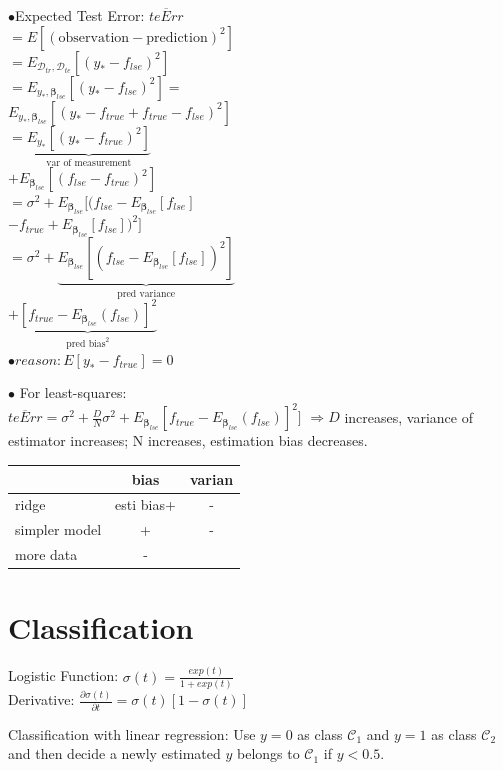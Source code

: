 \documentclass[10pt,a4paper,landscape]{article}
\newcommand{\bbeta}{\boldsymbol\beta}
\begin{document}
\begin{multicols*}{6}
 $\bullet$Expected Test Error: $\overline{teErr}$\\
 $= E[(\text{observation} - \text{prediction})^2]  $\\
 $= E_{\mathcal{D}_{tr},\mathcal{D}_{te}}[(y_* - f_{lse})^2]$\\
 $= E_{y_*, \bbeta_{lse}}[(y_* - f_{lse})^2]= $\\
 $E_{y_*, \bbeta_{lse}}[(y_* - f_{true} + f_{true} - f_{lse})^2] $\\
 $=\underbrace{E_{y_*}[(y_* - f_{true})^2]}_{\text{var of measurement}} $\\
 $+ E_{\bbeta_{lse}}[(f_{lse} - f_{true})^2]$ \\
 $=\sigma^2 + E_{\bbeta_{lse}}[(f_{lse} - E_{\bbeta_{lse}}[f_{lse}]$\\
 $ -  f_{true}+E_{\bbeta_{lse}}[f_{lse}] )^2]$ \\
 $=\sigma^2 + \underbrace{E_{\bbeta_{lse}}[(f_{lse} - E_{\bbeta_{lse}}[f_{lse}])^2]}_{\text{pred variance}} $\\
 $+\underbrace{[f_{true}-E_{\bbeta_{lse}}(f_{lse})] ^2}_{\text{pred bias}^2}$\\
 $\bullet reason: E[y_*-f_{true}]=0$
 
 $\bullet$ For least-squares:\\
 $\overline{teErr}=\sigma^2 + \frac{D}{N}\sigma^2 +E_{\bbeta_{lse}}[f_{true}-E_{\bbeta_{lse}}(f_{lse})] ^2]$
 $\Rightarrow D$ increases, variance of estimator increases; N increases, estimation bias decreases.


\begin{tabular}{ l || c | c }
                          & bias & varian \\
  \hline
ridge          & esti bias+    & - \\
simpler model    & +    & - \\
more data               & -    & \\
  \hline
\end{tabular}

\section{Classification}
Logistic Function: $\sigma(t) = \frac{exp(t)}{1+exp(t)}$\\
Derivative: $\frac{ \partial\sigma(t) }{ \partial t } = \sigma(t)[ 1 - \sigma(t) ]$

Classification with linear regression: Use $y = 0$ as class $\mathcal{C}_1$
and $y = 1$ as class $\mathcal{C}_2$ and then decide a newly estimated $y$ belongs
to $\mathcal{C}_1$ if $y < 0.5$.


\end{multicols*}
\end{document}
